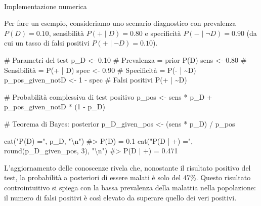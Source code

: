 \documentclass[
  letterpaper,
  DIV=11,
  numbers=noendperiod,
  oneside]{scrreprt}
\makeatletter
\let\oldparagraph\paragraph
\renewcommand{\paragraph}{
    \@ifstar
      \xxxParagraphStar
      \xxxParagraphNoStar
  }
\newcommand{\xxxParagraphStar}[1]{\oldparagraph*{#1}\mbox{}}
\newcommand{\xxxParagraphNoStar}[1]{\oldparagraph{#1}\mbox{}}
\newenvironment{Shaded}{\begin{snugshade}}{\end{snugshade}}
\newcommand{\CommentTok}[1]{\textcolor[rgb]{0.37,0.37,0.37}{#1}}
\newcommand{\DecValTok}[1]{\textcolor[rgb]{0.68,0.00,0.00}{#1}}
\newcommand{\FloatTok}[1]{\textcolor[rgb]{0.68,0.00,0.00}{#1}}
\newcommand{\FunctionTok}[1]{\textcolor[rgb]{0.28,0.35,0.67}{#1}}
\newcommand{\NormalTok}[1]{\textcolor[rgb]{0.00,0.23,0.31}{#1}}
\newcommand{\OtherTok}[1]{\textcolor[rgb]{0.00,0.23,0.31}{#1}}
\newcommand{\SpecialCharTok}[1]{\textcolor[rgb]{0.37,0.37,0.37}{#1}}
\newcommand{\StringTok}[1]{\textcolor[rgb]{0.13,0.47,0.30}{#1}}
\theoremstyle{definition}
\theoremstyle{plain}
\theoremstyle{definition}
\theoremstyle{remark}
\makeatother
\begin{document}
\paragraph{Implementazione numerica}\label{implementazione-numerica}

Per fare un esempio, consideriamo uno scenario diagnostico con
prevalenza \(P(D) = 0.10\), sensibilità \(P(+ \mid D) = 0.80\) e
specificità \(P(- \mid \neg D) = 0.90\) (da cui un tasso di falsi
positivi \(P(+ \mid \neg D) = 0.10\)).

\begin{Shaded}
\begin{Highlighting}[]
\CommentTok{\# Parametri del test}
\NormalTok{p\_D   }\OtherTok{\textless{}{-}} \FloatTok{0.10}       \CommentTok{\# Prevalenza = prior P(D)}
\NormalTok{sens  }\OtherTok{\textless{}{-}} \FloatTok{0.80}       \CommentTok{\# Sensibilità = P(+ | D)}
\NormalTok{spec  }\OtherTok{\textless{}{-}} \FloatTok{0.90}       \CommentTok{\# Specificità = P({-} | \textasciitilde{}D)}
\NormalTok{p\_pos\_given\_notD }\OtherTok{\textless{}{-}} \DecValTok{1} \SpecialCharTok{{-}}\NormalTok{ spec  }\CommentTok{\# Falsi positivi P(+ | \textasciitilde{}D)}

\CommentTok{\# Probabilità complessiva di test positivo}
\NormalTok{p\_pos }\OtherTok{\textless{}{-}}\NormalTok{ sens }\SpecialCharTok{*}\NormalTok{ p\_D }\SpecialCharTok{+}\NormalTok{ p\_pos\_given\_notD }\SpecialCharTok{*}\NormalTok{ (}\DecValTok{1} \SpecialCharTok{{-}}\NormalTok{ p\_D)}

\CommentTok{\# Teorema di Bayes: posterior}
\NormalTok{p\_D\_given\_pos }\OtherTok{\textless{}{-}}\NormalTok{ (sens }\SpecialCharTok{*}\NormalTok{ p\_D) }\SpecialCharTok{/}\NormalTok{ p\_pos}

\FunctionTok{cat}\NormalTok{(}\StringTok{"P(D) ="}\NormalTok{, p\_D, }\StringTok{"}\SpecialCharTok{\textbackslash{}n}\StringTok{"}\NormalTok{)}
\CommentTok{\#\textgreater{} P(D) = 0.1}
\FunctionTok{cat}\NormalTok{(}\StringTok{"P(D | +) ="}\NormalTok{, }\FunctionTok{round}\NormalTok{(p\_D\_given\_pos, }\DecValTok{3}\NormalTok{), }\StringTok{"}\SpecialCharTok{\textbackslash{}n}\StringTok{"}\NormalTok{)}
\CommentTok{\#\textgreater{} P(D | +) = 0.471}
\end{Highlighting}
\end{Shaded}

L'aggiornamento delle conoscenze rivela che, nonostante il risultato
positivo del test, la probabilità a posteriori di essere malati è solo
del 47\%. Questo risultato controintuitivo si spiega con la bassa
prevalenza della malattia nella popolazione: il numero di falsi positivi
è così elevato da superare quello dei veri positivi.
\end{document}
